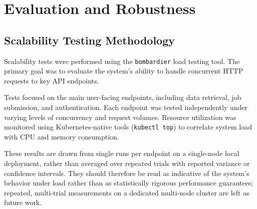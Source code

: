 \chapter{Evaluation and Robustness}
\label{Chapter-Evaluation-Robustness}

\section{Scalability Testing Methodology}

Scalability tests were performed using the \texttt{bombardier} load testing tool. The primary goal was to evaluate the system's ability to handle concurrent HTTP requests to key API endpoints.

Tests focused on the main user-facing endpoints, including data retrieval, job submission, and authentication. Each endpoint was tested independently under varying levels of concurrency and request volumes. Resource utilization was monitored using Kubernetes-native tools (\texttt{kubectl top}) to correlate system load with CPU and memory consumption.

These results are drawn from single runs per endpoint on a single-node local deployment, rather than averaged over
repeated trials with reported variance or confidence intervals. They should therefore be read as indicative of the
system's behavior under load rather than as statistically rigorous performance guarantees; repeated, multi-trial
measurements on a dedicated multi-node cluster are left as future work.


